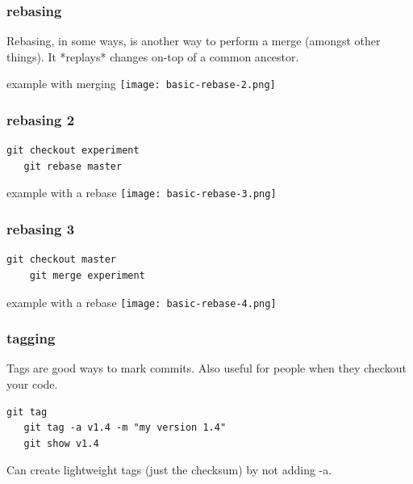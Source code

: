 \documentclass{beamer}
\begin{document}

\begin{frame}
  \frametitle{rebasing}
    Rebasing, in some ways, is another way to perform a merge (amongst other things). It *replays* changes on-top of a common ancestor.

  \begin{block}{example with merging}
    \texttt{[image: basic-rebase-2.png]}
  \end{block}

\end{frame}

\begin{frame}[fragile]
  \frametitle{rebasing 2}
  
  \begin{lstlisting}[caption=rebase] 
   git checkout experiment
   git rebase master
  \end{lstlisting}

  \begin{block}{example with a rebase}
    \texttt{[image: basic-rebase-3.png]}
  \end{block}

\end{frame}

\begin{frame}[fragile]
  \frametitle{rebasing 3}
  
  \begin{lstlisting}[caption=rebase] 
    git checkout master
    git merge experiment
  \end{lstlisting}

  \begin{block}{example with a rebase}
    \texttt{[image: basic-rebase-4.png]}
  \end{block}

\end{frame}



\begin{frame}[fragile]
  \frametitle{tagging}
  Tags are good ways to mark commits. Also useful for people when they checkout your code. 

  \begin{lstlisting}[caption=tagging] 
   git tag
   git tag -a v1.4 -m "my version 1.4"
   git show v1.4
  \end{lstlisting}

  Can create lightweight tags (just the checksum) by not adding -a.

\end{frame}
\end{document}
